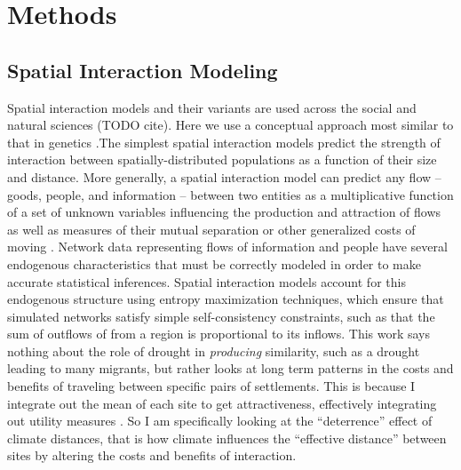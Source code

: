 \documentclass[10pt]{iopart}
\begin{document}
\section*{Methods}
\subsection*{Spatial Interaction Modeling}
Spatial interaction models and their variants are used across the social and natural sciences (TODO cite). Here we use a conceptual approach most similar to that in genetics \parencite{Murphy2010}.The simplest spatial interaction models predict the strength of interaction between spatially-distributed populations as a function of their size and distance. More generally, a spatial interaction model can predict any flow -- goods, people, and information -- between two entities as a multiplicative function of a set of unknown variables influencing the production and attraction of flows as well as measures of their mutual separation or other generalized costs of moving \parencite{Sen1995,Fotheringham1989}. Network data representing flows of information and people have several endogenous characteristics that must be correctly modeled in order to make accurate statistical inferences. Spatial interaction models account for this endogenous structure using entropy maximization techniques, which ensure that simulated networks satisfy simple self-consistency constraints, such as that the sum of outflows of from a region is proportional to its inflows.
This work says nothing about the role of drought in \textit{producing} similarity, such as a drought leading to many migrants, but rather looks at long term patterns in the costs and benefits of traveling between specific pairs of settlements. This is because I integrate out the mean of each site to get attractiveness, effectively integrating out utility measures \parencite{Bavaud2002,Bavaud2008}. So I am specifically looking at the ``deterrence'' effect of climate distances, that is how climate influences the ``effective distance'' between sites by altering the costs and benefits of interaction.

\end{document}
